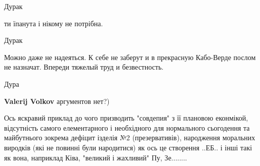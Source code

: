 \begin{itemize}
\begin{itemize}
Дурак
\end{itemize}

 
ти їпанута і нікому не потрібна.

\begin{itemize}
 
Дурак
\end{itemize}


Можно даже не надеяться. К себе не заберут и в прекрасную Кабо-Верде послом не
назначат. Впереди тяжелый труд и безвестность.

\begin{itemize}
 
Дура

 
\textbf{Valerij Volkov} аргументов нет?)
\end{itemize}


Ось яскравий приклад до чого призводить "совдепия" з її плановою еконмікой,
відсутність самого елементарного і необхідного для нормального сьогодення та
майбутнього зокрема дефіцит ізделія №2 (презервативів), народження моральних
виродків (які не повинні були народитися) як ось це створення ..ЕБ.. і інші
такі як вона, наприклад Ківа, "великий і жахливий" Пу, Зе........

\begin{itemize}
 

\end{itemize}
\end{itemize}
